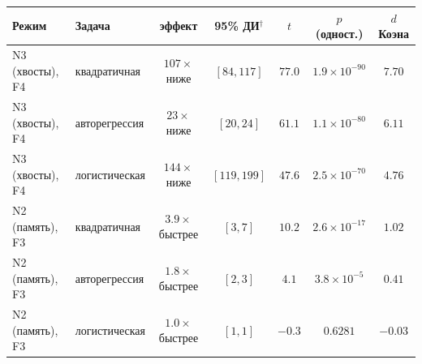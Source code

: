 \begin{tabular}{llccccc}
\toprule
Режим & Задача & эффект & 95\% ДИ$^{\dagger}$ & $t$ & $p$ (одност.) & $d$ Коэна \\
\midrule
N3 (хвосты), F4 & квадратичная & $107\times$ ниже & $[84,117]$ & $77.0$ & $1.9\!\times\!10^{-90}$ & $7.70$ \\
N3 (хвосты), F4 & авторегрессия & $23\times$ ниже & $[20,24]$ & $61.1$ & $1.1\!\times\!10^{-80}$ & $6.11$ \\
N3 (хвосты), F4 & логистическая & $144\times$ ниже & $[119,199]$ & $47.6$ & $2.5\!\times\!10^{-70}$ & $4.76$ \\
\midrule
N2 (память), F3 & квадратичная & $3.9\times$ быстрее & $[3,7]$ & $10.2$ & $2.6\!\times\!10^{-17}$ & $1.02$ \\
N2 (память), F3 & авторегрессия & $1.8\times$ быстрее & $[2,3]$ & $4.1$ & $3.8\!\times\!10^{-5}$ & $0.41$ \\
N2 (память), F3 & логистическая & $1.0\times$ быстрее & $[1,1]$ & $-0.3$ & $0.6281$ & $-0.03$ \\
\bottomrule
\end{tabular}
